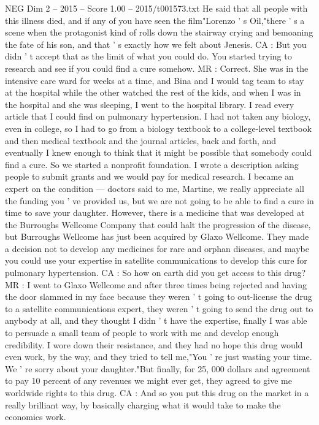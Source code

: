\begin{textsample}{NEG Dim 2 – 2015 – Score 1.00 – 2015/t001573.txt}
He said that all people with this illness died, and if any of you have seen the film"Lorenzo ' s Oil,"there ' s a scene when the protagonist kind of rolls down the stairway crying and bemoaning the fate of his son, and that ' s exactly how we felt about Jenesis.
CA : But you didn ' t accept that as the limit of what you could do.
You started trying to research and see if you could find a cure somehow.
MR : Correct.
She was in the intensive care ward for weeks at a time, and Bina and I would tag team to stay at the hospital while the other watched the rest of the kids, and when I was in the hospital and she was sleeping, I went to the hospital library.
I read every article that I could find on pulmonary hypertension.
I had not taken any biology, even in college, so I had to go from a biology textbook to a college-level textbook and then medical textbook and the journal articles, back and forth, and eventually I knew enough to think that it might be possible that somebody could find a cure.
So we started a nonprofit foundation.
I wrote a description asking people to submit grants and we would pay for medical research.
I became an expert on the condition — doctors said to me, Martine, we really appreciate all the funding you ' ve provided us, but we are not going to be able to find a cure in time to save your daughter.
However, there is a medicine that was developed at the Burroughs Wellcome Company that could halt the progression of the disease, but Burroughs Wellcome has just been acquired by Glaxo Wellcome.
They made a decision not to develop any medicines for rare and orphan diseases, and maybe you could use your expertise in satellite communications to develop this cure for pulmonary hypertension.
CA : So how on earth did you get access to this drug?
MR : I went to Glaxo Wellcome and after three times being rejected and having the door slammed in my face because they weren ' t going to out-license the drug to a satellite communications expert, they weren ' t going to send the drug out to anybody at all, and they thought I didn ' t have the expertise, finally I was able to persuade a small team of people to work with me and develop enough credibility.
I wore down their resistance, and they had no hope this drug would even work, by the way, and they tried to tell me,"You ' re just wasting your time.
We ' re sorry about your daughter."But finally, for 25, 000 dollars and agreement to pay 10 percent of any revenues we might ever get, they agreed to give me worldwide rights to this drug.
CA : And so you put this drug on the market in a really brilliant way, by basically charging what it would take to make the economics work.

\end{textsample}
